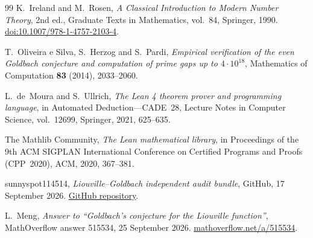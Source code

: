 \documentclass[11pt,a4paper]{ctexart}
\theoremstyle{plain}
\theoremstyle{definition}
\begin{document}
\begin{thebibliography}{99}
K.~Ireland and M.~Rosen,
\emph{A Classical Introduction to Modern Number Theory},
2nd ed., Graduate Texts in Mathematics, vol.~84, Springer, 1990.
\href{https://doi.org/10.1007/978-1-4757-2103-4}{doi:10.1007/978-1-4757-2103-4}.

T.~Oliveira e Silva, S.~Herzog and S.~Pardi,
\emph{Empirical verification of the even Goldbach conjecture and computation of prime gaps up to $4\cdot10^{18}$},
Mathematics of Computation \textbf{83} (2014), 2033--2060.

L.~de~Moura and S.~Ullrich,
\emph{The Lean 4 theorem prover and programming language},
in Automated Deduction---CADE~28, Lecture Notes in Computer Science, vol.~12699, Springer, 2021, 625--635.

The Mathlib Community,
\emph{The Lean mathematical library},
in Proceedings of the 9th ACM SIGPLAN International Conference on Certified Programs and Proofs (CPP~2020), ACM, 2020, 367--381.

sunnyspot114514,
\emph{Liouville--Goldbach independent audit bundle},
GitHub, 17 September 2026.
\href{https://github.com/sunnyspot114514/Liouville-Goldbach-audit}{GitHub repository}.

L.~Meng,
\emph{Answer to ``Goldbach's conjecture for the Liouville function''},
MathOverflow answer 515534, 25 September 2026.
\href{https://mathoverflow.net/a/515534}{mathoverflow.net/a/515534}.

\end{thebibliography}
\end{document}
